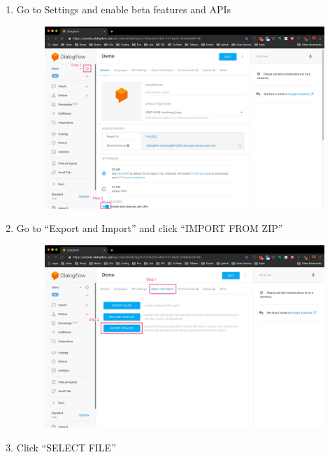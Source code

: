 \begin{enumerate}
	\item Go to Settings and enable beta features and APIs

	\begin{figure}[H]
		\centering
		\includegraphics[width=\linewidth, frame]{img/manual_3.jpg}
	\end{figure}

	\item Go to “Export and Import” and click “IMPORT FROM ZIP”

	\begin{figure}[H]
		\centering
		\includegraphics[width=\linewidth, frame]{img/manual_4.jpg}
	\end{figure}

	\item Click “SELECT FILE”


\end{enumerate}
